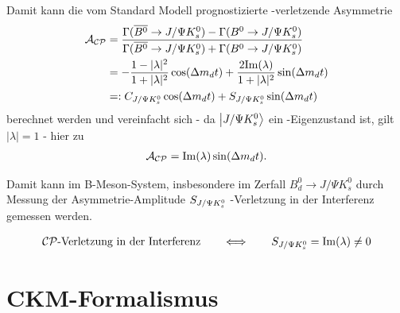 Damit kann die vom Standard Modell prognostizierte \CP-verletzende Asymmetrie 
\begin{align}
\mathcal{A}_{\text{$\mathcal{CP}$}} &= \frac{\Gamma (\overline{B^0} \rightarrow J/\Psi K_s^0) - \Gamma (B^0 \rightarrow J/\Psi K_s^0)}{\Gamma (\overline{B^0} \rightarrow J/\Psi K_s^0) + \Gamma (B^0 \rightarrow J/\Psi K_s^0)} \\
&= -\frac{1-|\lambda|^2}{1+|\lambda|^2}\cos(\Delta m_d t) + \frac{2\mathrm{Im}(\lambda)}{1+|\lambda|^2}\sin(\Delta m_d t) \\
&=: C_{J/\Psi K_s^0} \cos(\Delta m_d t) + S_{J/\Psi K_s^0} \sin(\Delta m_d t)
\end{align}
berechnet werden und vereinfacht sich - da $\Ket{J/\Psi K_s^0}$ ein \CP-Eigenzustand ist, gilt $|\lambda| = 1$ - hier zu
\begin{align}
\mathcal{A}_{\text{$\mathcal{CP}$}} = \mathrm{Im}(\lambda)\sin(\Delta m_d t) .
\end{align}

Damit kann im B-Meson-System, insbesondere im Zerfall $B_d^0 \rightarrow J/\Psi K_s^0$ durch Messung der Asymmetrie-Amplitude $S_{J/\Psi K_s^0}$ \CP-Verletzung in der Interferenz gemessen werden.

\begin{align}
\text{$\mathcal{CP}$-Verletzung in der Interferenz} \qquad \Longleftrightarrow \qquad S_{J/\Psi K_s^0} = \mathrm{Im}(\lambda)\neq 0
\end{align}

\section{CKM-Formalismus}